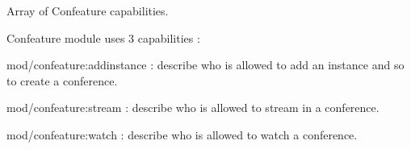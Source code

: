 Array of Confeature capabilities. 

Confeature module uses 3 capabilities \-:\par
 
\begin{DoxyItemize}
\item mod/confeature\-:addinstance \-: describe who is allowed to add an instance and so to create a conference. 
\item mod/confeature\-:stream \-: describe who is allowed to stream in a conference. 
\item mod/confeature\-:watch \-: describe who is allowed to watch a conference. 
\end{DoxyItemize}